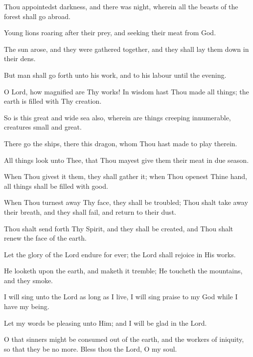 Thou appointedst darkness, and there was night, wherein all the beasts of the forest shall go abroad.

Young lions roaring after their prey, and seeking their meat from God.

The sun arose, and they were gathered together, and they shall lay them down in their dens.

But man shall go forth unto his work, and to his labour until the evening.

O Lord, how magnified are Thy works! In wisdom hast Thou made all things; the earth is filled with Thy creation.

So is this great and wide sea also, wherein are things creeping innumerable, creatures small and great.

There go the ships, there this dragon, whom Thou hast made to play therein.

All things look unto Thee, that Thou mayest give them their meat in due season.

When Thou givest it them, they shall gather it; when Thou openest Thine hand, all things shall be filled with good.

When Thou turnest away Thy face, they shall be troubled; Thou shalt take away their breath, and they shall fail, and return to their dust.

Thou shalt send forth Thy Spirit, and they shall be created, and Thou shalt renew the face of the earth.

Let the glory of the Lord endure for ever; the Lord shall rejoice in His works.

He looketh upon the earth, and maketh it tremble; He toucheth the mountains, and they smoke.

I will sing unto the Lord as long as I live, I will sing praise to my God while I have my being.

Let my words be pleasing unto Him; and I will be glad in the Lord.

O that sinners might be consumed out of the earth, and the workers of iniquity, so that they be no more. Bless thou the Lord, O
my soul.
